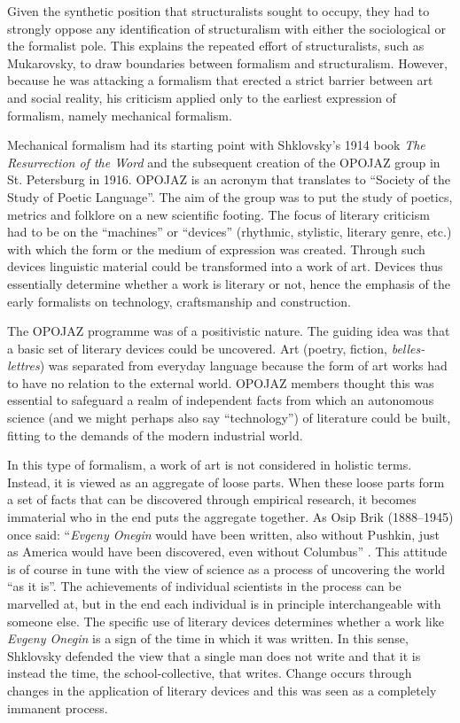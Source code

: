 \documentclass[output=paper]{langscibook}
\begin{document}
Given the synthetic position that structuralists sought to occupy, they had to strongly oppose any identification of structuralism with either the sociological or the formalist pole. This explains the repeated effort of structuralists, such as Mukarovsky, to draw boundaries between formalism and structuralism. However, because he was attacking a formalism that erected a strict barrier between art and social reality, his criticism applied only to the earliest expression of formalism, namely mechanical formalism.

Mechanical formalism had its starting point with Shklovsky's 1914 book \emph{The Resurrection of the Word} and the subsequent creation of the OPOJAZ group in St. Petersburg in 1916. OPOJAZ is an acronym that translates to ``Society of the Study of Poetic Language''. The aim of the group was to put the study of poetics, metrics and folklore on a new scientific footing. The focus of literary criticism had to be on the ``machines'' or ``devices'' (rhythmic, stylistic, literary genre, etc.) with which the form or the medium of expression was created. Through such devices linguistic material could be transformed into a work of art. Devices thus essentially determine whether a work is literary or not, hence the emphasis of the early formalists on technology, craftsmanship and construction.

The OPOJAZ programme was of a positivistic nature. The guiding idea was that a basic set of literary devices could be uncovered. Art (poetry, fiction, \emph{belles-lettres}) was separated from everyday language because the form of art works had to have no relation to the external world. OPOJAZ members thought this was essential to safeguard a realm of independent facts from which an autonomous science (and we might perhaps also say ``technology'') of literature could be built, fitting to the demands of the modern industrial world.

In this type of formalism, a work of art is not considered in holistic terms. Instead, it is viewed as an aggregate of loose parts. When these loose parts form a set of facts that can be discovered through empirical research, it becomes immaterial who in the end puts the aggregate together. As Osip Brik (1888--1945) once said: ``\emph{Evgeny Onegin} would have been written, also without Pushkin, just as America would have been discovered, even without Columbus'' \citep[213]{Brik1923}. This attitude is of course in tune with the view of science as a process of uncovering the world ``as it is''. The achievements of individual scientists in the process can be marvelled at, but in the end each individual is in principle interchangeable with someone else. The specific use of literary devices determines whether a work like \emph{Evgeny Onegin} is a sign of the time in which it was written. In this sense, Shklovsky defended the view that a single man does not write and that it is instead the time, the school-collective, that writes. Change occurs through changes in the application of literary devices and this was seen as a completely immanent process.
\end{document}
